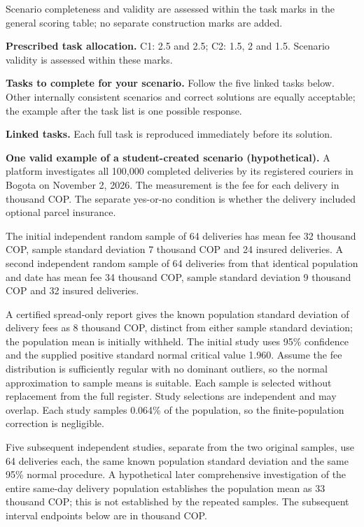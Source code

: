 Scenario completeness and validity are assessed within the task marks in the general scoring table; no separate construction marks are added.

\textbf{Prescribed task allocation.} C1: 2.5 and 2.5; C2: 1.5, 2 and 1.5. Scenario validity is assessed within these marks.

\textbf{Tasks to complete for your scenario.} Follow the five linked tasks below. Other internally consistent scenarios and correct solutions are equally acceptable; the example after the task list is one possible response.


\textbf{Linked tasks.} Each full task is reproduced immediately before its solution.


\clearpage

\textbf{One valid example of a student-created scenario (hypothetical).}
A platform investigates all 100,000 completed deliveries by its registered couriers in Bogota on November 2, 2026. The measurement is the fee for each delivery in thousand COP. The separate yes-or-no condition is whether the delivery included optional parcel insurance.

The initial independent random sample of 64 deliveries has mean fee 32 thousand COP, sample standard deviation 7 thousand COP and 24 insured deliveries. A second independent random sample of 64 deliveries from that identical population and date has mean fee 34 thousand COP, sample standard deviation 9 thousand COP and 32 insured deliveries.

A certified spread-only report gives the known population standard deviation of delivery fees as 8 thousand COP, distinct from either sample standard deviation; the population mean is initially withheld. The initial study uses 95\% confidence and the supplied positive standard normal critical value 1.960. Assume the fee distribution is sufficiently regular with no dominant outliers, so the normal approximation to sample means is suitable. Each sample is selected without replacement from the full register. Study selections are independent and may overlap. Each study samples 0.064\% of the population, so the finite-population correction is negligible.

Five subsequent independent studies, separate from the two original samples, use 64 deliveries each, the same known population standard deviation and the same 95\% normal procedure. A hypothetical later comprehensive investigation of the entire same-day delivery population establishes the population mean as 33 thousand COP; this is not established by the repeated samples. The subsequent interval endpoints below are in thousand COP.

